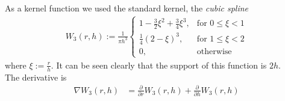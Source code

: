 \documentclass{sigchi}
\begin{document}
As a kernel function we used the standard kernel, the \emph{cubic spline}
\begin{align*}
	W_3(r,h) := \frac{1}{\pi h^3}
	\begin{cases}
		1 - \frac{3}{2} \xi^2 + \frac{3}{4} \xi^3, &\text{for } 0 \le \xi < 1 \\
		\frac{1}{4} (2-\xi)^3, &\text{for } 1 \le \xi < 2 \\
		0, &\text{otherwise}
	\end{cases}
\end{align*}
%
where $\xi := \frac{r}{h}$. It can be seen clearly that the support of this function is $2h$. \\
The derivative is
%
\begin{align*}
	\nabla W_3(r,h) &= \frac{\partial}{\partial r} W_3(r,h) + \frac{\partial}{\partial h} W_3(r,h)
\end{align*}
%
\end{document}
